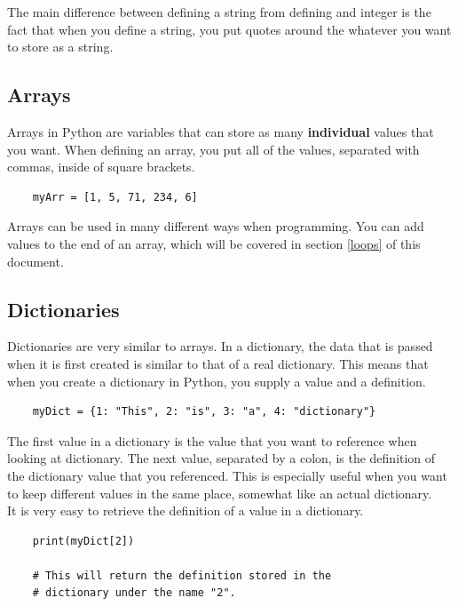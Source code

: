 \documentclass[12pt, letterpaper]{article}
\begin{document}
    The main difference between defining a string from defining and integer is the fact that when you define a string, you put quotes around the whatever you want to store as a string.

    \subsection{Arrays} \label{arrays}

    Arrays in Python are variables that can store as many \textbf{individual} values that you want. When defining an array, you put all of the values, separated with commas, inside of square brackets.

    \begin{verbatim}
    myArr = [1, 5, 71, 234, 6]
    \end{verbatim}

    Arrays can be used in many different ways when programming. You can add values to the end of an array, which will be covered in section \ref{loops} of this document.
    
    \subsection{Dictionaries} \label{dictionaries}

    Dictionaries are very similar to arrays. In a dictionary, the data that is passed when it is first created is similar to that of a real dictionary. This means that when you create a dictionary in Python, you supply a value and a definition.

    \begin{verbatim}
    myDict = {1: "This", 2: "is", 3: "a", 4: "dictionary"}
    \end{verbatim}

    The first value in a dictionary is the value that you want to reference when looking at dictionary. The next value, separated by a colon, is the definition of the dictionary value that you referenced. This is especially useful when you want to keep different values in the same place, somewhat like an actual dictionary. \\

    It is very easy to retrieve the definition of a value in a dictionary. 

    \begin{verbatim}
    print(myDict[2])

    # This will return the definition stored in the 
    # dictionary under the name "2".
    \end{verbatim}
\end{document}
